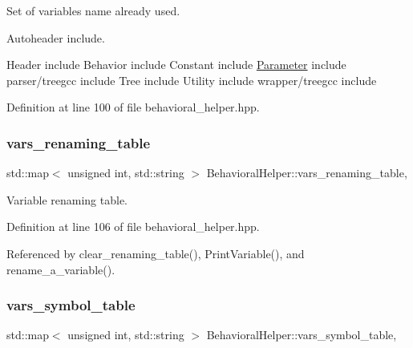 Set of variables name already used. 

Autoheader include.

Header include Behavior include Constant include \hyperlink{classParameter}{Parameter} include parser/treegcc include Tree include Utility include wrapper/treegcc include 

Definition at line 100 of file behavioral\+\_\+helper.\+hpp.

\mbox{\label{classBehavioralHelper_a40105f6e1e485144749342e449dbce6a}} 
\subsubsection{\texorpdfstring{vars\+\_\+renaming\+\_\+table}{vars\_renaming\_table}}
{\footnotesize\ttfamily std\+::map$<$ unsigned int, std\+::string $>$ Behavioral\+Helper\+::vars\+\_\+renaming\+\_\+table\hspace{0.3cm}{\ttfamily [static]}, {\ttfamily [protected]}}



Variable renaming table. 



Definition at line 106 of file behavioral\+\_\+helper.\+hpp.



Referenced by clear\+\_\+renaming\+\_\+table(), Print\+Variable(), and rename\+\_\+a\+\_\+variable().

\mbox{\label{classBehavioralHelper_a60d18de9e876b3d89aa2b0be9b5d8d97}} 
\subsubsection{\texorpdfstring{vars\+\_\+symbol\+\_\+table}{vars\_symbol\_table}}
{\footnotesize\ttfamily std\+::map$<$ unsigned int, std\+::string $>$ Behavioral\+Helper\+::vars\+\_\+symbol\+\_\+table\hspace{0.3cm}{\ttfamily [static]}, {\ttfamily [protected]}}



